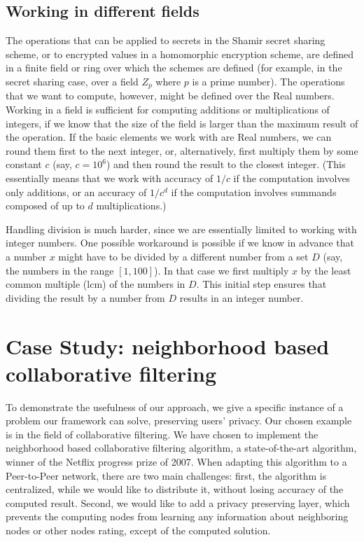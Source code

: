 \documentclass[times, 10pt,twocolumn]{article}
\begin{document}
\subsection{Working in different fields}
The operations that can be applied to secrets in the Shamir secret
sharing scheme, or to encrypted values in a homomorphic encryption
scheme, are defined in a finite field or ring over which the schemes
are defined (for example, in the secret sharing case, over a field
$Z_p$ where $p$ is a prime number). The operations that we want to
compute, however, might be defined over the Real numbers.  Working
in a field is sufficient for computing additions or
multiplications of integers, if we know that the size of the field
is larger than the maximum result of the operation. If the basic
elements we work with are Real numbers, we can round them first to
the next integer, or, alternatively, first multiply them by some
constant $c$ (say, $c=10^6$) and then round the result to the
closest integer. (This essentially means that we work with
accuracy of $1/c$ if the computation involves only additions, or
an accuracy of $1/c^d$ if the computation involves summands
composed of up to $d$ multiplications.)

Handling division is much harder, since  we are essentially limited
to working with integer numbers. One possible workaround is
possible if we know in advance that a number $x$ might have to be
divided by a different number from a set $D$ (say, the numbers in
the range $[1,100]$). In that case we first multiply $x$ by the
least common multiple (lcm) of the numbers in $D$. This initial
step ensures that dividing the result by a number from $D$ results
in an integer number.


\section{Case Study: neighborhood based collaborative filtering}
\label{jacobi} To demonstrate the usefulness of our approach, we
give a specific instance of a problem our framework can solve,
preserving users' privacy. Our chosen example is in the field of
collaborative filtering. We have chosen to implement the
neighborhood based collaborative filtering algorithm, a
state-of-the-art algorithm, winner of the Netflix progress prize
of 2007. When adapting this algorithm to a Peer-to-Peer network,
there are two main challenges: first, the algorithm is
centralized, while we would like to distribute it, without losing
accuracy of the computed result. Second, we would like to add a
privacy preserving layer, which prevents the computing nodes from
learning any information about neighboring nodes or other nodes
rating, except of the computed solution.
\end{document}
